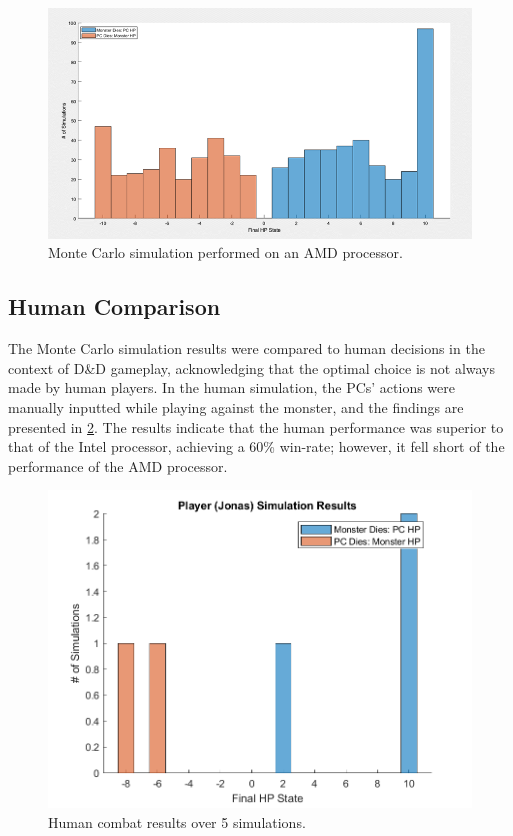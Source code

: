\documentclass[letterpaper, 10 pt, conference]{ieeeconf}
\begin{document}
\begin{figure}[thb]
    \centering
    \includegraphics[width=\columnwidth]{figs/DND_MChist_AMD.png}
    \caption{Monte Carlo simulation performed on an AMD processor.}
    \label{fig:monte_carlo_hist_amd}
\end{figure}

\subsection{Human Comparison}
The Monte Carlo simulation results were compared to human decisions in the context of D\&D gameplay, acknowledging that the optimal choice is not always made by human players. 
In the human simulation, the PCs' actions were manually inputted while playing against the monster, and the findings are presented in \cref{fig:dnd_player_hist}. 
The results indicate that the human performance was superior to that of the Intel processor, achieving a 60\% win-rate; however, it fell short of the performance of the AMD processor.

\begin{figure}[thb]
    \centering
    \includegraphics[scale = 0.5]{figs/DND_player_jonas_hist.png}
    \caption{Human combat results over 5 simulations.}
    \label{fig:dnd_player_hist}
\end{figure}
\end{document}
